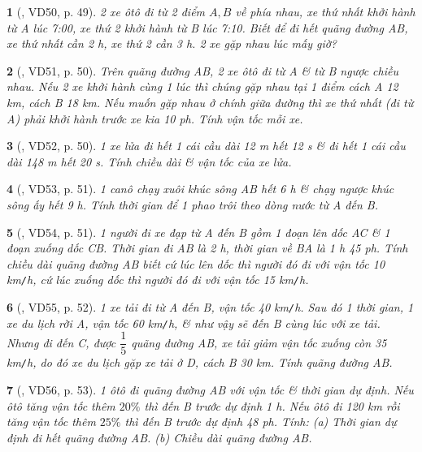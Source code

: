 \documentclass{article}
\newtheorem{baitoan}{}
\begin{document}
\begin{baitoan}[\cite{Binh_Toan_6_tap_2}, VD50, p. 49]
	2 xe ôtô đi từ 2 điểm $A,B$ về phía nhau, xe thứ nhất khởi hành từ A lúc {\rm7:00}, xe thứ 2 khởi hành từ B lúc {\rm7:10}. Biết để đi hết quãng đường AB, xe thứ nhất cần {\rm2 h}, xe thứ 2 cần {\rm3 h}. 2 xe gặp nhau lúc mấy giờ?
\end{baitoan}

\begin{baitoan}[\cite{Binh_Toan_6_tap_2}, VD51, p. 50]
	Trên quãng đường AB, 2 xe ôtô đi từ A \& từ B ngược chiều nhau. Nếu 2 xe khởi hành cùng 1 lúc thì chúng gặp nhau tại 1 điểm cách A {\rm12 km}, cách B {\rm18 km}. Nếu muốn gặp nhau ở chính giữa đường thì xe thứ nhất (đi từ A) phải khởi hành trước xe kia {\rm10 ph}. Tính vận tốc mỗi xe.
\end{baitoan}

\begin{baitoan}[\cite{Binh_Toan_6_tap_2}, VD52, p. 50]
	1 xe lửa đi hết 1 cái cầu dài {\rm12 m} hết {\rm12 s} \& đi hết 1 cái cầu dài {\rm148 m} hết {\rm20 s}. Tính chiều dài \& vận tốc của xe lửa.
\end{baitoan}

\begin{baitoan}[\cite{Binh_Toan_6_tap_2}, VD53, p. 51]
	1 canô chạy xuôi khúc sông AB hết {\rm6 h} \& chạy ngược khúc sông ấy hết {\rm9 h}. Tính thời gian để 1 phao trôi theo dòng nước từ A đến B.
\end{baitoan}

\begin{baitoan}[\cite{Binh_Toan_6_tap_2}, VD54, p. 51]
	1 người đi xe đạp từ A đến B gồm 1 đoạn lên dốc AC \& 1 đoạn xuống dốc CB. Thời gian đi AB là {\rm2 h}, thời gian về BA là {\rm1 h 45 ph}. Tính chiều dài quãng đường AB biết cứ lúc lên dốc thì người đó đi với vận tốc {\rm10 km{\tt/}h}, cứ lúc xuống dốc thì người đó đi với vận tốc {\rm15 km{\tt/}h}.
\end{baitoan}

\begin{baitoan}[\cite{Binh_Toan_6_tap_2}, VD55, p. 52]
	1 xe tải đi từ A đến B, vận tốc {\rm40 km{\tt/}h}. Sau đó 1 thời gian, 1 xe du lịch rời A, vận tốc {\rm60 km{\tt/}h}, \& như vậy sẽ đến B cùng lúc với xe tải. Nhưng đi đến C, được $\dfrac{1}{5}$ quãng đường AB, xe tải giảm vận tốc xuống còn {\rm35 km{\tt/}h}, do đó xe du lịch gặp xe tải ở D, cách B {\rm30 km}. Tính quãng đường AB.
\end{baitoan}

\begin{baitoan}[\cite{Binh_Toan_6_tap_2}, VD56, p. 53]
	1 ôtô đi quãng đường AB với vận tốc \& thời gian dự định. Nếu ôtô tăng vận tốc thêm $20\%$ thì đến B trước dự định {\rm1 h}. Nếu ôtô đi {\rm120 km} rồi tăng vận tốc thêm $25\%$ thì đến B trước dự định {\rm48 ph}. Tính: (a) Thời gian dự định đi hết quãng đường AB. (b) Chiều dài quãng đường AB.
\end{baitoan}
\end{document}
